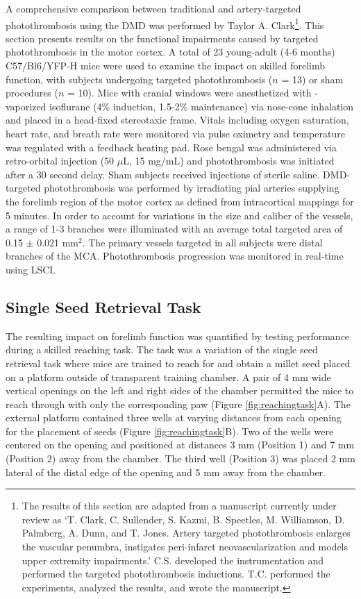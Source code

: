 A comprehensive comparison between traditional and artery-targeted photothrombosis using the DMD was performed by Taylor A. Clark\footnote{The results of this section are adapted from a manuscript currently under review as `T. Clark, C. Sullender, S. Kazmi, B. Speetles, M. Williamson, D. Palmberg, A. Dunn, and T. Jones. Artery targeted photothrombosis enlarges the vascular penumbra, instigates peri-infarct neovascularization and models upper extremity impairments.' C.S. developed the instrumentation and performed the targeted photothrombosis inductions. T.C. performed the experiments, analyzed the results, and wrote the manuscript.}. This section presents results on the functional impairments caused by targeted photothrombosis in the motor cortex. A total of 23 young-adult (4-6 months) C57/Bl6/YFP-H mice were used to examine the impact on skilled forelimb function, with subjects undergoing targeted photothrombosis ($n$ = 13) or sham procedures ($n$ = 10). Mice with cranial windows were anesthetized with -vaporized isoflurane (4\% induction, 1.5-2\% maintenance) via nose-cone inhalation and placed in a head-fixed stereotaxic frame. Vitals including oxygen saturation, heart rate, and breath rate were monitored via pulse oximetry and temperature was regulated with a feedback heating pad. Rose bengal was administered via retro-orbital injection (50 $\mu$L, 15 mg/mL) and photothrombosis was initiated after a 30 second delay. Sham subjects received injections of sterile saline. DMD-targeted photothrombosis was performed by irradiating pial arteries supplying the forelimb region of the motor cortex as defined from intracortical mappings \cite{Tennant:2011cx} for 5 minutes. In order to account for variations in the size and caliber of the vessels, a range of 1-3 branches were illuminated with an average total targeted area of 0.15 $\pm$ 0.021 mm$^2$. The primary vessels targeted in all subjects were distal branches of the MCA. Photothrombosis progression was monitored in real-time using LSCI.

\subsection{Single Seed Retrieval Task}

The resulting impact on forelimb function was quantified by testing performance during a skilled reaching task. The task was a variation of the single seed retrieval task \cite{Chen:2014hy} where mice are trained to reach for and obtain a millet seed placed on a platform outside of transparent training chamber. A pair of 4 mm wide vertical openings on the left and right sides of the chamber permitted the mice to reach through with only the corresponding paw (Figure \ref{fig:reachingtask}A). The external platform contained three wells at varying distances from each opening for the placement of seeds (Figure \ref{fig:reachingtask}B). Two of the wells were centered on the opening and positioned at distances 3 mm (Position 1) and 7 mm (Position 2) away from the chamber. The third well (Position 3) was placed 2 mm lateral of the distal edge of the opening and 5 mm away from the chamber.

